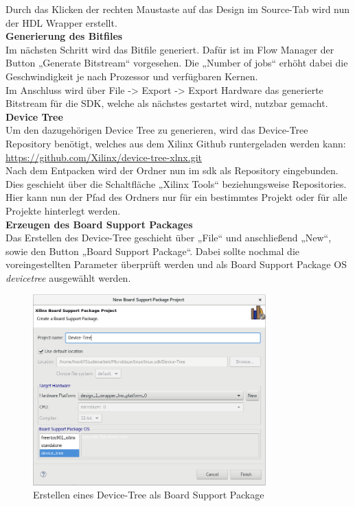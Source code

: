 Durch das Klicken der rechten Maustaste auf das Design im Source-Tab wird nun der HDL Wrapper erstellt.\\

\textbf{Generierung des Bitfiles}\\

Im nächsten Schritt wird das Bitfile generiert. Dafür ist im Flow Manager der Button „Generate Bitstream“ vorgesehen.
 Die „Number of jobs“ erhöht dabei die Geschwindigkeit je nach Prozessor und verfügbaren Kernen.\\
 Im Anschluss wird über File -> Export -> Export Hardware das generierte Bitstream für die SDK, welche als nächstes gestartet wird, nutzbar gemacht.\\


\textbf{Device Tree}\\

Um den dazugehörigen Device Tree zu generieren, wird das Device-Tree
 Repository benötigt, welches aus dem Xilinx Github runtergeladen werden kann: \url{https://github.com/Xilinx/device-tree-xlnx.git}\\
Nach dem Entpacken wird der Ordner nun im \ac{sdk} als Repository eingebunden.
 Dies geschieht über die Schaltfläche „Xilinx Tools“ beziehungsweise Repositories.
  Hier kann nun der Pfad des Ordners nur für ein bestimmtes Projekt oder für alle Projekte hinterlegt werden.\\

\textbf{Erzeugen des Board Support Packages}\\

Das Erstellen des Device-Tree geschieht über „File“ und anschließend „New“, sowie den Button „Board Support Package“.
Dabei sollte nochmal die voreingestellten Parameter überprüft werden und als Board Support Package OS
\emph{devicetree} ausgewählt werden.

\begin{figure}[H]
\centering
\includegraphics[width=0.8\textwidth]{Hauptteil/Schritt14.png}
\caption{Erstellen eines Device-Tree als Board Support Package}\label{fig:mbschritt14}
\end{figure}

